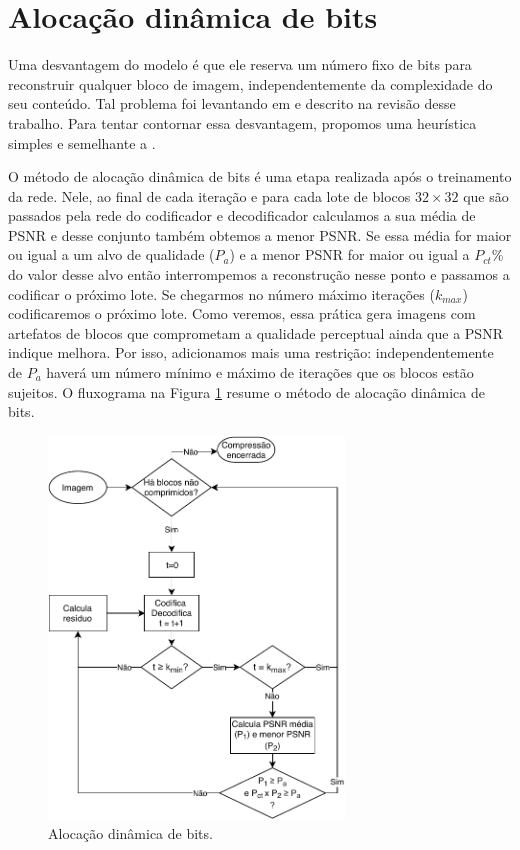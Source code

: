 \section{Alocação dinâmica de bits}\label{sec:adb}
Uma desvantagem do modelo é que ele reserva um número fixo de bits para reconstruir qualquer bloco de imagem, independentemente da complexidade do seu conteúdo. Tal problema foi levantando em \cite{Priming2017Johnston} e descrito na revisão desse trabalho. Para tentar contornar essa desvantagem, propomos uma heurística simples e semelhante a \cite{Priming2017Johnston}.

O método de alocação dinâmica de bits é uma etapa realizada após o treinamento da rede. Nele, ao final de cada iteração e para cada lote de blocos $32 \times 32$ que são passados pela rede do codificador e decodificador calculamos a sua média de PSNR e desse conjunto também obtemos a menor PSNR. Se essa média for maior ou igual a um alvo de qualidade ($P_{a}$) e a menor PSNR for maior ou igual a $P_{ct}$\% do valor desse alvo então interrompemos a reconstrução nesse ponto e passamos a codificar o próximo lote. Se chegarmos no número máximo iterações ($k_{max}$) codificaremos o próximo lote.
Como veremos, essa prática gera imagens com artefatos de blocos que comprometam a qualidade perceptual ainda que a PSNR indique melhora. Por isso, adicionamos mais uma restrição: independentemente de $P_{a}$ haverá um número mínimo e máximo de iterações que os blocos estão sujeitos. O fluxograma na Figura \ref{fig:flux_vr} resume o método de alocação dinâmica de bits. 


\begin{figure}
\centering
\includegraphics[width=0.7\textwidth]{figuras/fluxograma.pdf}
\caption{Alocação dinâmica de bits.}
\label{fig:flux_vr}
\end{figure}		


